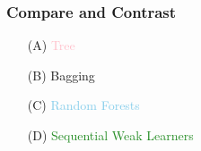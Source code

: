 \documentclass[xcolor={dvipsnames}]{beamer}
\begin{document}
\frame
{
 \frametitle{Compare and Contrast}
\LARGE
\begin{itemize}
\item[(A)] \textcolor{pink}{Tree} 
\LARGE %
\item[(B)] \textcolor{Dandelion}{Bagging}  
\LARGE
\item[(C)] \textcolor{SkyBlue}{Random Forests} 
\LARGE
\item[(D)] \textcolor{ForestGreen}{Sequential Weak Learners} 
\end{itemize}

\begin{figure}
\centering
{}
\end{figure}

}
\end{document}

